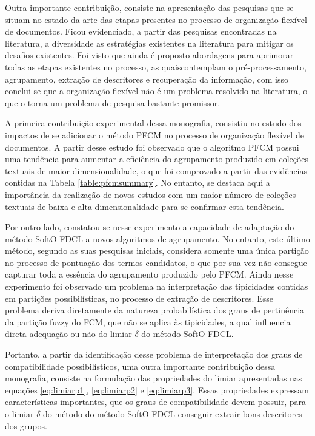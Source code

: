 Outra importante contribuição, consiste na apresentação das pesquisas que se situam no estado da
arte das etapas presentes no processo de organização flexível de documentos. Ficou evidenciado, a
partir das pesquisas encontradas na literatura, a diversidade as estratégias existentes na literatura
para mitigar os desafios existentes. Foi visto que ainda é proposto abordagens para aprimorar todas
as etapas existentes no processo, as quaiscontemplam o pré-processamento, agrupamento, extração
de descritores e recuperação da informação, com isso conclui-se que a organização flexível não é um
problema resolvido na literatura, o que o torna um problema de pesquisa bastante promissor. 

A primeira contribuição experimental dessa monografia, consistiu no estudo dos impactos de se
adicionar o método PFCM no processo de organização flexível de documentos. A partir desse estudo
foi observado que o algoritmo PFCM possui uma tendência para aumentar a eficiência do
agrupamento produzido em coleções textuais de maior dimensionalidade, o que foi comprovado a partir
das evidências contidas na Tabela \ref{table:pfcmsummary}. No entanto, se destaca aqui a importância
da realização de novos estudos com um maior número de coleções textuais de baixa e alta
dimensionalidade para se confirmar esta tendência. 

Por outro lado, constatou-se nesse experimento a capacidade de adaptação do método
SoftO-FDCL a novos algoritmos de agrupamento. No entanto, este último método, segundo as suas pesquisas iniciais, considera somente uma única
partição no processo de pontuação dos termos candidatos, o que por sua vez não consegue capturar
toda a essência do agrupamento produzido pelo PFCM. Ainda nesse experimento foi observado um
problema na interpretação das tipicidades contidas em partições possibilísticas, no processo de
extração de descritores. Esse problema deriva diretamente da natureza probabilística dos graus de
pertinência da partição fuzzy do FCM, que não se aplica às tipicidades, a qual influencia
direta adequação ou não do limiar $\delta$ do método SoftO-FDCL. 

Portanto, a partir da identificação desse problema de interpretação dos graus de compatibilidade
possibilísticos, uma outra importante contribuição dessa monografia, consiste na formulação das
propriedades do limiar apresentadas nas equações \ref{eq:limiarp1}, \ref{eq:limiarp2} e
\ref{eq:limiarp3}. Essas propriedades expressam características importantes, que os graus de
compatibilidade devem possuir, para o limiar $\delta$ do método do método SoftO-FDCL conseguir
extrair bons descritores dos grupos. 

